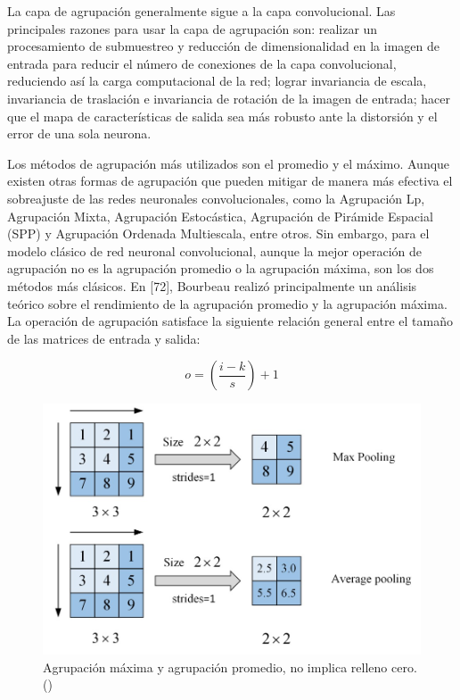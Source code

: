  La capa de agrupación generalmente sigue a la capa convolucional. Las principales razones para usar la capa de agrupación son: realizar un procesamiento de submuestreo y reducción de dimensionalidad en la imagen de entrada para reducir el número de conexiones de la capa convolucional, reduciendo así la carga computacional de la red; lograr invariancia de escala, invariancia de traslación e invariancia de rotación de la imagen de entrada; hacer que el mapa de características de salida sea más robusto ante la distorsión y el error de una sola neurona.
 
 Los métodos de agrupación más utilizados son el promedio y el máximo. Aunque existen otras formas de agrupación que pueden mitigar de manera más efectiva el sobreajuste de las redes neuronales convolucionales, como la Agrupación Lp, Agrupación Mixta, Agrupación Estocástica, Agrupación de Pirámide Espacial (SPP) y Agrupación Ordenada Multiescala, entre otros. Sin embargo, para el modelo clásico de red neuronal convolucional, aunque la mejor operación de agrupación no es la agrupación promedio o la agrupación máxima, son los dos métodos más clásicos. En [72], Bourbeau realizó principalmente un análisis teórico sobre el rendimiento de la agrupación promedio y la agrupación máxima. La operación de agrupación satisface la siguiente relación general entre el tamaño de las matrices de entrada y salida:
 
\[o = \left( \frac{{i - k}}{s} \right) + 1 \]

 \begin{figure}[H]
	\begin{center}
		\includegraphics[width=1\textwidth]{2/figures/cnn2.jpeg}
		\caption{Agrupación máxima y agrupación promedio, no implica relleno cero.(\cite{tecnica2})}
	\end{center}
\end{figure}
 
